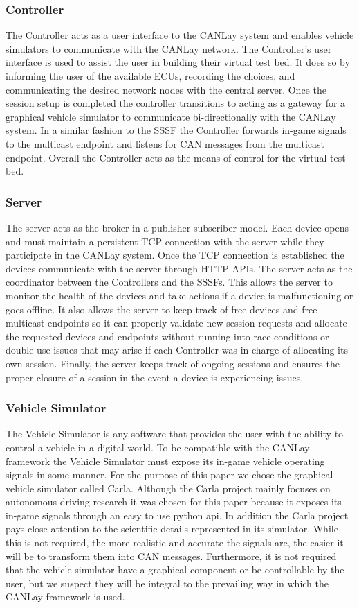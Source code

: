 \documentclass[letterpaper,twocolumn,12pt]{article}
\begin{document}
\subsubsection{Controller}
The Controller acts as a user interface to the CANLay system and enables vehicle simulators to communicate with the CANLay network. The Controller’s user interface is used to assist the user in building their virtual test bed. It does so by informing the user of the available ECUs, recording the choices, and communicating the desired network nodes with the central server. Once the session setup is completed the controller transitions to acting as a gateway for a graphical vehicle simulator to communicate bi-directionally with the CANLay system. In a similar fashion to the SSSF the Controller forwards in-game signals to the multicast endpoint and listens for CAN messages from the multicast endpoint. Overall the Controller acts as the means of control for the virtual test bed.

\subsubsection{Server}
The server acts as the broker in a publisher subscriber model. Each device opens and must maintain a persistent TCP connection with the server while they participate in the CANLay system. Once the TCP connection is established the devices communicate with the server through HTTP APIs. The server acts as the coordinator between the Controllers and the SSSFs. This allows the server to monitor the health of the devices and take actions if a device is malfunctioning or goes offline. It also allows the server to keep track of free devices and free multicast endpoints so it can properly validate new session requests and allocate the requested devices and endpoints without running into race conditions or double use issues that may arise if each Controller was in charge of allocating its own session. Finally, the server keeps track of ongoing sessions and ensures the proper closure of a session in the event a device is experiencing issues.

\subsubsection{Vehicle Simulator}
The Vehicle Simulator is any software that provides the user with the ability to control a vehicle in a digital world. To be compatible with the CANLay framework the Vehicle Simulator must expose its in-game vehicle operating signals in some manner. For the purpose of this paper we chose the graphical vehicle simulator called Carla. Although the Carla project mainly focuses on autonomous driving research it was chosen for this paper because it exposes its in-game signals through an easy to use python api. In addition the Carla project pays close attention to the scientific details represented in its simulator. While this is not required, the more realistic and accurate the signals are, the easier it will be to transform them into CAN messages. Furthermore, it is not required that the vehicle simulator have a graphical component or be controllable by the user, but we suspect they will be integral to the prevailing way in which the CANLay framework is used.
\end{document}
